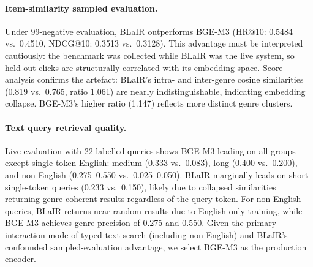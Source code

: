 \paragraph{Item-similarity sampled evaluation.}
Under 99-negative evaluation, BLaIR outperforms BGE-M3 (HR@10: 0.5484
vs.\ 0.4510, NDCG@10: 0.3513 vs.\ 0.3128). This advantage must be
interpreted cautiously: the benchmark was collected while BLaIR was the
live system, so held-out clicks are structurally correlated with its
embedding space.
Score analysis confirms the artefact: BLaIR's intra- and inter-genre
cosine similarities (0.819 vs.\ 0.765, ratio 1.061) are nearly
indistinguishable, indicating embedding collapse. BGE-M3's higher ratio
(1.147) reflects more distinct genre clusters.

\paragraph{Text query retrieval quality.}
Live evaluation with 22 labelled queries shows BGE-M3 leading on all
groups except single-token English: medium (0.333 vs.\ 0.083), long
(0.400 vs.\ 0.200), and non-English (0.275--0.550 vs.\ 0.025--0.050).
BLaIR marginally leads on short single-token queries (0.233 vs.\ 0.150),
likely due to collapsed similarities returning genre-coherent results
regardless of the query token.
For non-English queries, BLaIR returns near-random results due to
English-only training, while BGE-M3 achieves genre-precision of 0.275
and 0.550.
Given the primary interaction mode of typed text search (including
non-English) and BLaIR's confounded sampled-evaluation advantage, we
select BGE-M3 as the production encoder.

